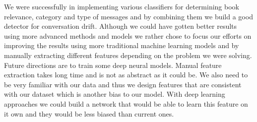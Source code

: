\documentclass[11pt,a4paper]{article}
\begin{document}
We were successfully in implementing various classifiers for determining book relevance, category and type of messages and by combining them we build a good detector for conversation drift.
Although we could have gotten better results using more advanced methods and models we rather chose to focus our efforts on improving the results using more traditional machine learning models and by manually extracting different features depending on the problem we were solving.
Future directions are to train some deep neural models.
Manual feature extraction takes long time and is not as abstract as it could be.
We also need to be very familiar with our data and thus we design features that are consistent with our dataset which is another bias to our model.
With deep learning approaches we could build a network that would be able to learn this feature on it own and they would be less biased than current ones.



% 


\end{document}
